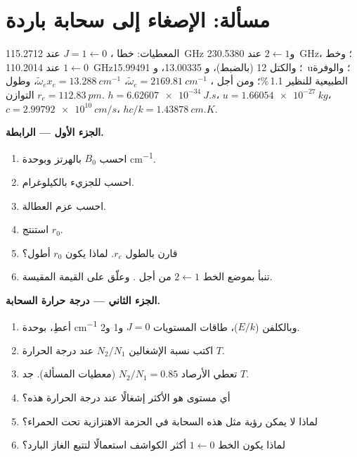 \section{مسألة: الإصغاء إلى سحابة باردة}

\begin{problem}
\label{pb:b3:rovibrational-spectroscopy:1}
المعطيات: خطا ، $J = 1 \leftarrow 0$ عند \qty{115.2712}{GHz} و$2
\leftarrow 1$ عند \qty{230.5380}{GHz}؛ وخط ، $1 \leftarrow 0$ عند
\qty{110.2014}{GHz}؛ والكتل  12 (بالضبط)، و 13.00335،
و \qty{15.99491}{u}؛ والوفرة الطبيعية للنظير  1.1\,\%؛ ومن أجل ،
$\tilde\omega_e = \qty{2169.81}{cm^{-1}}$، $\tilde\omega_ex_e = \qty{13.288}{cm^{-1}}$، 
وطول التوازن $r_e = \qty{112.83}{pm}$. $h = \qty{6.62607e-34}{J.s}$، $u =
\qty{1.66054e-27}{kg}$، $c = \qty{2.99792e10}{cm/s}$، $hc/k = \qty{1.43878}{cm.K}$.

\medskip\noindent\textbf{الجزء الأول --- الرابطة.}
\begin{enumerate}
  \item احسب $B_0$ بالهرتز وبوحدة \unit{cm^{-1}}.
  \item احسب  للجزيء  بالكيلوغرام.
  \item احسب عزم العطالة.
  \item استنتج $r_0$.
  \item قارن بالطول $r_e$. لماذا يكون $r_0$ أطول؟
  \item تنبأ بموضع الخط $2 \leftarrow 1$ من أجل . وعلّق على
        القيمة المقيسة.
\end{enumerate}

\medskip\noindent\textbf{الجزء الثاني --- درجة حرارة السحابة.}
\begin{enumerate}[resume]
  \item أعطِ، بوحدة \unit{cm^{-1}} وبالكلفن ($E/k$)، طاقات المستويات $J =
        0$ و1 و2.
  \item اكتب نسبة الإشغالين $N_2/N_1$ عند درجة الحرارة $T$.
  \item تعطي الأرصاد $N_2/N_1 = 0.85$ (معطيات المسألة). جد $T$.
  \item أي مستوى هو الأكثر إشغالًا عند درجة الحرارة هذه؟
  \item لماذا لا يمكن رؤية مثل هذه السحابة في الحزمة الاهتزازية تحت الحمراء؟
  \item لماذا يكون الخط $1 \leftarrow 0$ أكثر الكواشف استعمالًا لتتبع الغاز البارد؟
\end{enumerate}


\end{problem}
